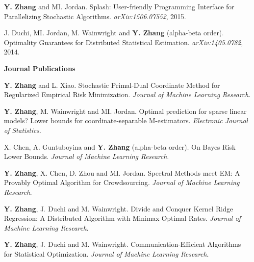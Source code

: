 \documentclass{res} %
\begin{document}
\begin{resume}
\begin{enumerate}[label={[M\arabic*]}, ref={M\arabic*}]
\item \label{splash}\textbf{Y. Zhang} and MI. Jordan. Splash: User-friendly Programming Interface for Parallelizing Stochastic Algorithms. \emph{arXiv:1506.07552}, 2015.

\item J. Duchi, MI. Jordan, M. Wainwright and \textbf{Y. Zhang} (alpha-beta order). Optimality Guarantees for Distributed Statistical Estimation. \emph{arXiv:1405.0782}, 2014.\label{optimality}
\end{enumerate}

{\bf\Large Journal Publications}
\vspace{5pt}

\begin{enumerate}[label={[J\arabic*]}, ref={J\arabic*}]

\item \textbf{Y. Zhang} and L. Xiao. Stochastic Primal-Dual Coordinate Method for Regularized Empirical Risk Minimization.
\emph{Journal of Machine Learning Research}.\label{stochastic-jmlr}

\item \textbf{Y. Zhang}, M. Wainwright and MI. Jordan. Optimal prediction for sparse linear models? Lower bounds for coordinate-separable M-estimators.\label{optimality-ejs}
\emph{Electronic Journal of Statistics}.

\item X. Chen, A. Guntuboyina and \textbf{Y. Zhang} (alpha-beta order). On Bayes Risk Lower Bounds.
\emph{Journal of Machine Learning Research}.\label{on-bayes-jmlr}

\item \textbf{Y. Zhang}, X. Chen, D. Zhou and MI. Jordan. Spectral Methods meet EM: A Provably Optimal Algorithm for Crowdsourcing.
\emph{Journal of Machine Learning Research}.\label{spectral-jmlr}

\item \textbf{Y. Zhang}, J. Duchi and M. Wainwright. Divide and Conquer Kernel Ridge Regression: A Distributed Algorithm with Minimax Optimal Rates.
\emph{Journal of Machine Learning Research}.\label{divide-jmlr}

\item \textbf{Y. Zhang}, J. Duchi and M. Wainwright. Communication-Efficient Algorithms for Statistical Optimization.
\emph{Journal of Machine Learning Research}.\label{communication-jmlr}


\end{enumerate}
\end{resume}
\end{document}
